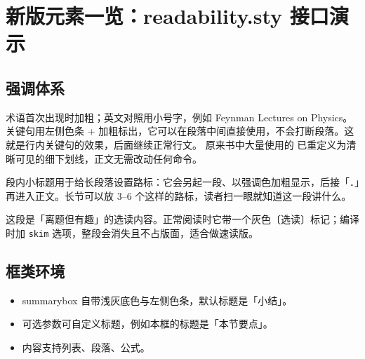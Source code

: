 \documentclass[UTF8, 12pt, a4paper, twoside]{ctexbook}
\newcommand{\chapterintro}[1]{}
\newcommand{\readingpath}[1]{}
\newcommand{\runin}[1]{}
\newcommand{\pullquote}[1]{}
\newcommand{\aside}[1]{}
\newcommand{\term}[1]{#1}
\newcommand{\enterm}[1]{#1}
\newcommand{\keyidea}[1]{#1}
\newenvironment{optional}{}{}
\begin{document}


\ifdemoafter
\clearpage
\chapter*{新版元素一览：readability.sty 接口演示}
\chapterintro{这一页集中演示 \texttt{readability.sty} 提供的全部正文元素。正文作者只需要调用这些宏，样式细节（颜色、字号、左右留白、黑白模式）全部由样式包集中管理，换配色或改字号不用动正文。}
\readingpath{先看强调体系，再看框类环境，最后看页边注与选读。}

\section*{强调体系}
\term{术语}首次出现时加粗；英文对照用小号字，例如 \enterm{Feynman Lectures on Physics}。
\keyidea{关键句用左侧色条 + 加粗标出，它可以在段落中间直接使用，不会打断段落。}这就是行内关键句的效果，后面继续正常行文。
原来书中大量使用的  已重定义为清晰可见的细下划线，正文无需改动任何命令。

\runin{段内小标题}段内小标题用于给长段落设置路标：它会另起一段、以强调色加粗显示，后接「．」再进入正文。长节可以放 3--6 个这样的路标，读者扫一眼就知道这一段讲什么。

\pullquote{“What I cannot create, I do not understand.” —— 我不能创造的东西，我就不能理解。}

\begin{optional}
这段是「离题但有趣」的选读内容。正常阅读时它带一个灰色〔选读〕标记；编译时加 \texttt{skim} 选项，整段会消失且不占版面，适合做速读版。
\end{optional}

\aside{页边注示例：译者注、单词解释、旁白提示都可以放在这里，小号灰字，紧贴正文右侧。}

\section*{框类环境}
\begin{summarybox}[本节要点]
  \begin{itemize}
    \item summarybox 自带浅灰底色与左侧色条，默认标题是「小结」。
    \item 可选参数可自定义标题，例如本框的标题是「本节要点」。
    \item 内容支持列表、段落、公式。
  \end{itemize}
\end{summarybox}
\end{document}
